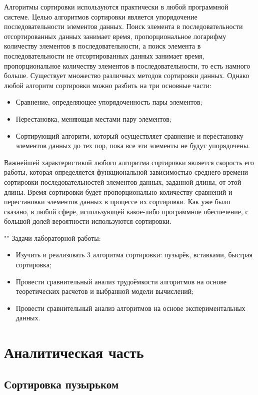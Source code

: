 \documentclass[12pt]{report}
\begin{document}
Алгоритмы сортировки используются практически в любой программной системе. Целью алгоритмов сортировки является упорядочение последовательности элементов данных. Поиск элемента в последовательности отсортированных данных занимает время, пропорциональное логарифму количеству элементов в последовательности, а поиск элемента в последовательности не отсортированных данных занимает время, пропорциональное количеству элементов в последовательности, то есть намного больше. Существует множество различных методов сортировки данных. Однако любой алгоритм сортировки можно разбить на три основные части:

\begin{itemize}
	\item Сравнение, определяющее упорядоченность пары элементов;
	\item Перестановка, меняющая местами пару элементов;
	\item Сортирующий алгоритм, который осуществляет сравнение и перестановку элементов данных до тех пор, пока все эти элементы не будут упорядочены.
\end{itemize}

Важнейшей характеристикой любого алгоритма сортировки является скорость его работы, которая определяется функциональной зависимостью среднего времени сортировки последовательностей элементов данных, заданной длины, от этой длины. Время сортировки будет пропорционально количеству сравнений и перестановки элементов данных в процессе их сортировки. Как уже было сказано, в любой сфере, использующей какое-либо программное обеспечение, с большой долей вероятности используются сортировки.  

""\newline
Задачи лабораторной работы:
\begin{itemize}
	\item Изучить и реализовать 3 алгоритма сортировки: пузырёк, вставками, быстрая сортировка;
	\item Провести сравнительный анализ трудоёмкости алгоритмов на основе теоретических расчетов и выбранной модели вычислений;
	\item Провести сравнительный анализ алгоритмов на основе экспериментальных данных.
\end{itemize}

\chapter{Аналитическая часть}

\section{Сортировка пузырьком}
\end{document}
